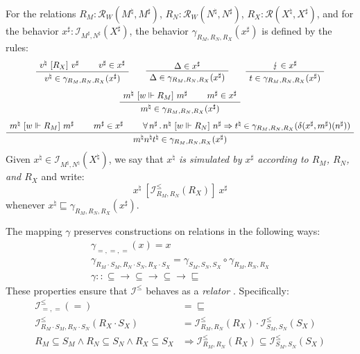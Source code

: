 \documentclass[acmsmall,timestamp,review,anonymous]{acmart}
\newcommand{\ifr}[1]{\ [{#1}]\ }
\begin{document}
\begin{definition}
For the relations $R_M : \mathcal{R}_W(M^\natural, M^\sharp)$,
$R_N : \mathcal{R}_W(N^\natural, N^\sharp)$,
$R_X : \mathcal{R}(X^\natural, X^\sharp)$, and
for the behavior $x^\sharp : \mathcal{I}_{M^\sharp, N^\sharp}(X^\sharp)$,
the behavior $\gamma_{R_M,R_N,R_X}(x^\sharp)$ is defined by the rules:
\begin{gather*}
  \AxiomC{$v^\natural \ifr{R_X} v^\sharp$}
  \AxiomC{$v^\sharp \in x^\sharp$}
  \BinaryInfC{$v^\natural \in \gamma_{R_M,R_N,R_X}(x^\sharp)$}
  \DisplayProof
  \qquad
  \AxiomC{$\Delta \in x^\sharp$}
  \UnaryInfC{$\Delta \in \gamma_{R_M,R_N,R_X}(x^\sharp)$}
  \DisplayProof
  \qquad
  \AxiomC{$\lightning \in x^\sharp$}
  \UnaryInfC{$t \in \gamma_{R_M,R_N,R_X}(x^\sharp)$}
  \DisplayProof
  \\[1ex]
  \AxiomC{$m^\natural \ifr{w \Vdash R_M} m^\sharp$}
  \AxiomC{$m^\sharp \in x^\sharp$}
  \BinaryInfC{$m^\natural \in \gamma_{R_M,R_N,R_X}(x^\sharp)$}
  \DisplayProof
  \\[1ex]
  \AxiomC{$m^\natural \ifr{w \Vdash R_M} m^\sharp$}
  \AxiomC{$m^\sharp \in x^\sharp$}
  \AxiomC{$
      \forall \, n^\sharp \,.\,
        n^\natural \ifr{w \Vdash R_N} n^\sharp \Rightarrow
        t^\natural \in \gamma_{R_M,R_N,R_X}(\delta(x^\sharp, m^\sharp)(n^\sharp))$}
  \TrinaryInfC{$m^\natural n^\natural t^\natural \in \gamma_{R_M,R_N,R_X}(x^\sharp)$}
  \DisplayProof
\end{gather*}
Given $x^\natural \in \mathcal{I}_{M^\natural,N^\natural}(X^\natural)$,
we say that
\emph{$x^\natural$ is simulated by $x^\sharp$ according to
$R_M$, $R_N$, and $R_X$} and write:
\[
    x^\natural \ifr{\mathcal{I}^\le_{R_M,R_N}(R_X)} x^\sharp
\]
whenever $x^\natural \sqsubseteq \gamma_{R_M,R_N,R_X}(x^\sharp)$.
\end{definition}

The mapping $\gamma$ preserves constructions
on relations in the following ways:
\begin{gather*}
\gamma_{=,=,=}(x) = x \\
\gamma_{R_M \cdot S_M, R_N \cdot S_N, R_X \cdot S_X} =
  \gamma_{S_M, S_N, S_X} \circ \gamma_{R_M, R_N, R_X} \\
\gamma :: {\subseteq} \rightarrow {\subseteq} \rightarrow
  {\subseteq} \rightarrow {\sqsubseteq}
\end{gather*}
These properties ensure that
$\mathcal{I}^\le$ behaves as a \emph{relator} \cite{something}.
Specifically:
\begin{align*}
  \mathcal{I}^\le_{=,=}(=) &= {\sqsubseteq} \\
  \mathcal{I}^\le_{R_M \cdot S_M, R_N \cdot S_N}(R_X \cdot S_X) &=
    \mathcal{I}^\le_{R_M, R_N}(R_X) \cdot
    \mathcal{I}^\le_{S_M, S_N}(S_X) \\
  R_M \subseteq S_M \wedge
  R_N \subseteq S_N \wedge
  R_X \subseteq S_X &\Rightarrow
    \mathcal{I}^\le_{R_M, R_N}(R_X) \subseteq
    \mathcal{I}^\le_{S_M, S_N}(S_X)
\end{align*}
\end{document}
